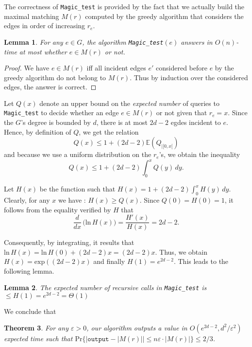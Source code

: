 \documentclass{jams-l}
\newtheorem{theorem}{Theorem}[section]
\newtheorem{lemma}[theorem]{Lemma}
\theoremstyle{definition}
\theoremstyle{remark}
\numberwithin{equation}{section}
\begin{document}
The correctness of \texttt{Magic\_test} is provided by the fact that we actually build the maximal matching $M(r)$ computed by the greedy algorithm that considers the edges in order of increasing $r_e$.

\begin{lemma}
For any $e \in G$, the algorithm \texttt{Magic\_test}$(e)$ answers in $O(n)$-time at most whether $e \in M(r)$ or not.
\end{lemma}
\begin{proof}
We have $e \in M(r)$ iff all incident edges $e'$ considered before $e$ by the greedy algorithm do not belong to $M(r)$. Thus by induction over the considered edges, the answer is correct.
\end{proof}

Let $Q(x)$ denote an upper bound on the \emph{expected number} of queries to \texttt{Magic\_test} to decide whether an edge $e \in M(r)$ or not given that $r_e = x$. Since the $G$'s degree is bounded by $d$, there is at most $2d-2$ egdes incident to $e$. Hence, by definition of $Q$, we get the relation
\[
Q(x) \leq 1 + (2d-2)\mathbb{E}(Q_{|[0,x[})
\]
and because we use a uniform distribution on the $r_e$'s, we obtain the inequality
\[
Q(x) \leq 1 + (2d-2) \int_0^x Q(y)\,dy.
\]

Let $H(x)$ be the function such that $H(x) = 1 +(2d-2) \int_0^x H(y)\,dy$. Clearly, for any $x$ we have : $H(x) \geq Q(x)$. Since $Q(0) = H(0) = 1$, it follows from the equality verified by $H$ that
\[
\frac{d}{dx}\,\Big(\mathrm{ln}\,H(x)\Big) = \frac{H'(x)}{H(x)} = 2d-2.
\]

Consequently, by integrating, it results that $\mathrm{ln}\,H(x) = \mathrm{ln}\,H(0)+ (2d-2)x = (2d-2)x$. Thus, we obtain $H(x) = \mathrm{exp}((2d-2)x)$ and finally $H(1) = e^{2d-2}$. This leads to the following lemma.

\begin{lemma}
The expected number of recursive calls in \texttt{Magic\_test} is $\leq H(1) = e^{2d-2} = \Theta(1)$
\end{lemma}

We conclude that

\begin{theorem}
For any $\varepsilon >0$, our algorithm outputs a value in $O(e^{2d-2},d^2/\varepsilon^2)$ expected time such that $\mathrm{Pr}\{ |\texttt{output} - |M(r)|| \leq n \varepsilon \cdot |M(r)|\} \leq 2/3$.
\end{theorem}




\end{document}
